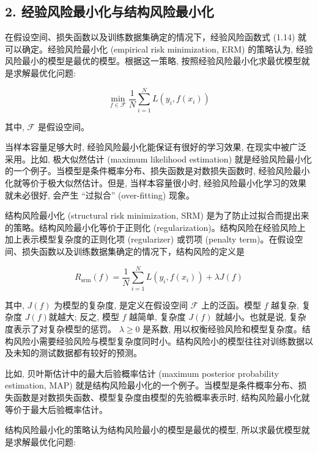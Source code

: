 \documentclass[10pt]{article}
\begin{document}
\begin{CJK*}{UTF8}{bsmi}
\section*{2. 经验风险最小化与结构风险最小化}
在假设空间、损失函数以及训练数据集确定的情况下，经验风险函数式 (1.14) 就可以确定。经验风险最小化 (empirical risk minimization, ERM) 的策略认为, 经验风险最小的模型是最优的模型。根据这一策略, 按照经验风险最小化求最优模型就是求解最优化问题:


\begin{equation*}
\min _{f \in \mathcal{F}} \frac{1}{N} \sum_{i=1}^{N} L\left(y_{i}, f\left(x_{i}\right)\right) \tag{1.15}
\end{equation*}


其中, $\mathcal{F}$ 是假设空间。

当样本容量足够大时, 经验风险最小化能保证有很好的学习效果, 在现实中被广泛采用。比如, 极大似然估计 (maximum likelihood estimation) 就是经验风险最小化的一个例子。当模型是条件概率分布、损失函数是对数损失函数时, 经验风险最小化就等价于极大似然估计。但是, 当样本容量很小时, 经验风险最小化学习的效果就未必很好, 会产生 “过拟合” (over-fitting) 现象。

结构风险最小化 (structural risk minimization, SRM) 是为了防止过拟合而提出来的策略。结构风险最小化等价于正则化 (regularization)。结构风险在经验风险上加上表示模型复杂度的正则化项 (regularizer) 或罚项 (penalty term)。在假设空间、损失函数以及训练数据集确定的情况下，结构风险的定义是


\begin{equation*}
R_{\mathrm{srm}}(f)=\frac{1}{N} \sum_{i=1}^{N} L\left(y_{i}, f\left(x_{i}\right)\right)+\lambda J(f) \tag{1.16}
\end{equation*}


其中, $J(f)$ 为模型的复杂度, 是定义在假设空间 $\mathcal{F}$ 上的泛函。模型 $f$ 越复杂, 复杂度 $J(f)$就越大; 反之, 模型 $f$ 越简单, 复杂度 $J(f)$ 就越小。也就是说, 复杂度表示了对复杂模型的惩罚。 $\lambda \geqslant 0$ 是系数, 用以权衡经验风险和模型复杂度。结构风险小需要经验风险与模型复杂度同时小。结构风险小的模型往往对训练数据以及未知的测试数据都有较好的预测。

比如, 贝叶斯估计中的最大后验概率估计 (maximum posterior probability estimation, MAP) 就是结构风险最小化的一个例子。当模型是条件概率分布、损失函数是对数损失函数、模型复杂度由模型的先验概率表示时, 结构风险最小化就等价于最大后验概率估计。

结构风险最小化的策略认为结构风险最小的模型是最优的模型, 所以求最优模型就是求解最优化问题:



\end{CJK*}
\end{document}
